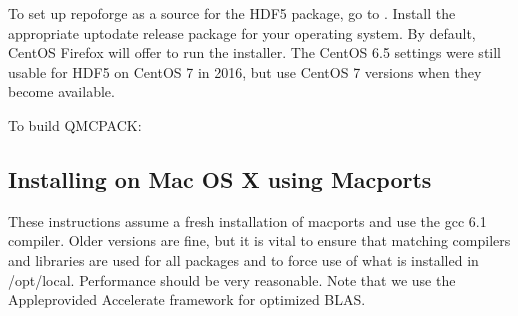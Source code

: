 \documentclass[letterpaper,10pt,english]{sphinxmanual}
\begin{document}
\begin{sphinxVerbatim}[commandchars=\\\{\}]
           \PYGZbs{}
                     
     
  
\end{sphinxVerbatim}

To set up repoforge as a source for the HDF5 package, go to
. Install the appropriate up\sphinxhyphen{}to\sphinxhyphen{}date
release package for your operating system. By default, CentOS Firefox will offer
to run the installer. The CentOS 6.5 settings were still usable for HDF5 on
CentOS 7 in 2016, but use CentOS 7 versions when they become
available.

\begin{sphinxVerbatim}[commandchars=\\\{\}]
    
\end{sphinxVerbatim}

To build QMCPACK:

\begin{sphinxVerbatim}[commandchars=\\\{\}]
  
 
 
 
 
  
  
\end{sphinxVerbatim}


\subsection{Installing on Mac OS X using Macports}
\label{\detokenize{installation:installing-on-mac-os-x-using-macports}}
These instructions assume a fresh installation of macports
and use the gcc 6.1 compiler. Older versions are fine, but it is vital to ensure that
matching compilers and libraries are used for all
packages and to force use of what is installed in /opt/local.  Performance should be very reasonable.
Note that we use the Apple\sphinxhyphen{}provided Accelerate framework for
optimized BLAS.
\end{document}

